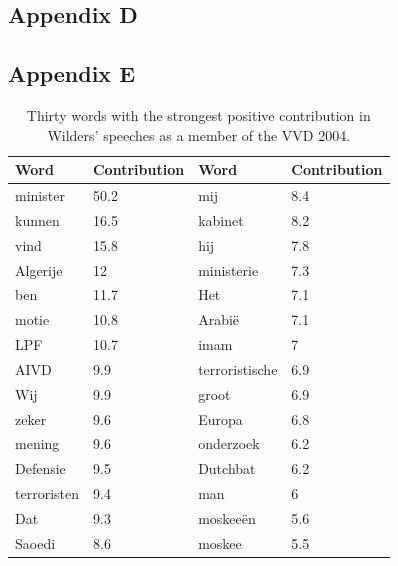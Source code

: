\documentclass{article}
\begin{document}
\subsection*{Appendix D}


\subsection*{Appendix E}
\begin{table}[ht!]
\begin{tabular}{|l|l|l|l|}
\hline
Word        & Contribution & Word           & Contribution \\ \hline
minister    & 50.2         & mij            & 8.4          \\ \hline
kunnen      & 16.5         & kabinet        & 8.2          \\ \hline
vind        & 15.8         & hij            & 7.8          \\ \hline
Algerije    & 12           & ministerie     & 7.3          \\ \hline
ben         & 11.7         & Het            & 7.1          \\ \hline
motie       & 10.8         & Arabië         & 7.1          \\ \hline
LPF         & 10.7         & imam           & 7            \\ \hline
AIVD        & 9.9          & terroristische & 6.9          \\ \hline
Wij         & 9.9          & groot          & 6.9          \\ \hline
zeker       & 9.6          & Europa         & 6.8          \\ \hline
mening      & 9.6          & onderzoek      & 6.2          \\ \hline
Defensie    & 9.5          & Dutchbat       & 6.2          \\ \hline
terroristen & 9.4          & man            & 6            \\ \hline
Dat         & 9.3          & moskeeën       & 5.6          \\ \hline
Saoedi      & 8.6          & moskee         & 5.5          \\ \hline
\end{tabular}
\caption{Thirty words with the strongest positive contribution in Wilders' speeches as a member of the VVD 2004.}
\label{tab:wilders}
\end{table}
\end{document}
